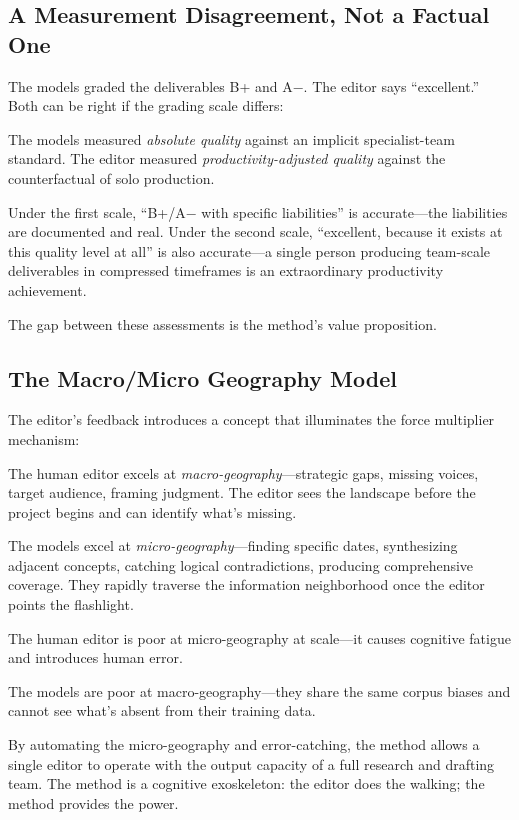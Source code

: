 \documentclass[11pt,letterpaper]{article}
\begin{document}
\subsection{A Measurement Disagreement, Not a Factual One}

The models graded the deliverables B+ and A$-$. The editor says ``excellent.'' Both can be right if the grading scale differs:

The models measured \emph{absolute quality} against an implicit specialist-team standard. The editor measured \emph{productivity-adjusted quality} against the counterfactual of solo production.

Under the first scale, ``B+/A$-$ with specific liabilities'' is accurate---the liabilities are documented and real. Under the second scale, ``excellent, because it exists at this quality level at all'' is also accurate---a single person producing team-scale deliverables in compressed timeframes is an extraordinary productivity achievement.

The gap between these assessments is the method's value proposition.

\subsection{The Macro/Micro Geography Model}

The editor's feedback introduces a concept that illuminates the force multiplier mechanism:

The human editor excels at \emph{macro-geography}---strategic gaps, missing voices, target audience, framing judgment. The editor sees the landscape before the project begins and can identify what's missing.

The models excel at \emph{micro-geography}---finding specific dates, synthesizing adjacent concepts, catching logical contradictions, producing comprehensive coverage. They rapidly traverse the information neighborhood once the editor points the flashlight.

The human editor is poor at micro-geography at scale---it causes cognitive fatigue and introduces human error.

The models are poor at macro-geography---they share the same corpus biases and cannot see what's absent from their training data.

By automating the micro-geography and error-catching, the method allows a single editor to operate with the output capacity of a full research and drafting team. The method is a cognitive exoskeleton: the editor does the walking; the method provides the power.
\end{document}
